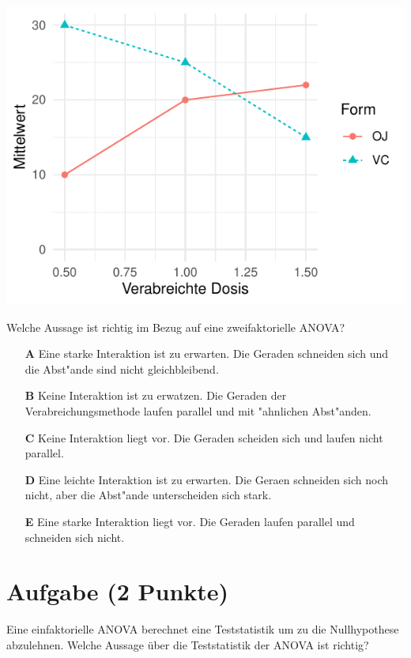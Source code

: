 \documentclass[a4paper, 10pt]{scrartcl}\usepackage[]{graphicx}\usepackage[]{xcolor}
\makeatletter
\def\maxwidth{ %
  \ifdim\Gin@nat@width>\linewidth
    \linewidth
  \else
    \Gin@nat@width
  \fi
}
\makeatother
\begin{document}
{\centering \includegraphics[width=\maxwidth]{img/mc-anova-02-a-1} 

}




Welche Aussage ist richtig im Bezug auf eine zweifaktorielle ANOVA?



\begin{enumerate}
\item [\textbf{A} \msquare] Eine starke Interaktion ist zu erwarten. Die Geraden schneiden sich und die Abst{"a}nde sind nicht gleichbleibend.
\item [\textbf{B} \msquare] Keine Interaktion ist zu erwatzen. Die Geraden der Verabreichungsmethode laufen parallel und mit {"a}hnlichen Abst{"a}nden.
\item [\textbf{C} \msquare] Keine Interaktion liegt vor. Die Geraden scheiden sich und laufen nicht parallel.
\item [\textbf{D} \msquare] Eine leichte Interaktion ist zu erwarten. Die Geraen schneiden sich noch nicht, aber die Abst{"a}nde unterscheiden sich stark.
\item [\textbf{E} \msquare] Eine starke Interaktion liegt vor. Die Geraden laufen parallel und schneiden sich nicht.
\end{enumerate} 

\section{Aufgabe \hfill (2 Punkte)}

Eine einfaktorielle ANOVA berechnet eine Teststatistik um zu die Nullhypothese abzulehnen. Welche Aussage {\"u}ber die Teststatistik der ANOVA ist richtig?
\end{document}
